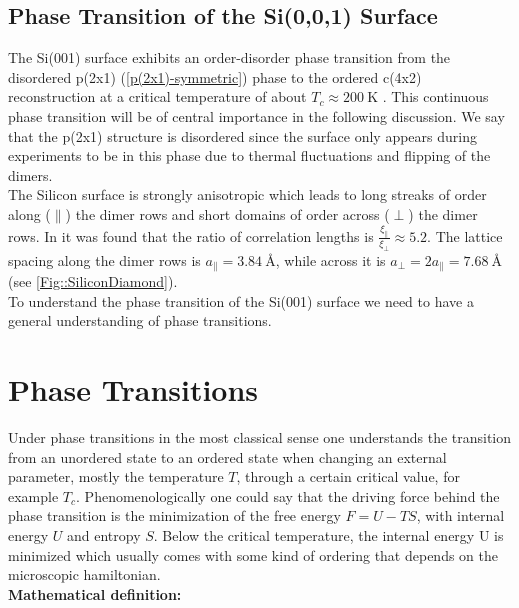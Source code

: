 \section{Phase Transition of the Si(0,0,1) Surface}
	The Si(001) surface exhibits an order-disorder phase transition from the disordered p(2x1) (\autoref{p(2x1)-symmetric}) phase to the ordered c(4x2) reconstruction at a critical temperature of about $T_c \approx 200~\text{K}$ \cite{tabata1987order}. This continuous phase transition will be of central importance in the following discussion. We say that the p(2x1) structure is disordered since the surface only appears during experiments to be in this phase due to thermal fluctuations and flipping of the dimers. \\
	
	The Silicon surface is strongly anisotropic which leads to long streaks of order along ($\parallel$) the dimer rows and short domains of order across ($\perp$) the dimer rows. In \cite{brand2023dimer} it was found that the ratio of correlation lengths is $\frac{\xi_{\parallel}}{\xi_{\perp}} \approx 5.2$. The lattice spacing along the dimer rows is $a_\parallel =	3.84~\text{\AA}$, while across it is $a_\perp =	2 a_\parallel =	7.68~\text{\AA}$ (see \autoref{Fig::SiliconDiamond}). \\
	
	To understand the phase transition of the Si(001) surface we need to have a general understanding of phase transitions.
\chapter{Phase Transitions}
	Under phase transitions in the most classical sense one understands the transition from an unordered state to an ordered state when changing an external parameter, mostly the temperature $T$, through a certain critical value, for example $T_c$. Phenomenologically one could say that the driving force behind the phase transition is the minimization of the free energy $F = U - TS $, with internal energy $U$ and entropy $S$. Below the critical temperature, the internal energy U is minimized which usually comes with some kind of ordering that depends on the microscopic hamiltonian.
	\newline
	\\
	\textbf{Mathematical definition:}
	
